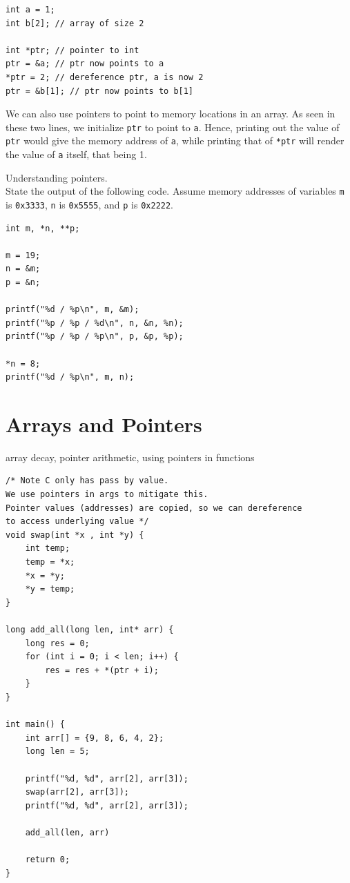 \begin{verbatim}
int a = 1;
int b[2]; // array of size 2

int *ptr; // pointer to int
ptr = &a; // ptr now points to a
*ptr = 2; // dereference ptr, a is now 2
ptr = &b[1]; // ptr now points to b[1]
\end{verbatim}

We can also use pointers to point to memory locations in an array.
As seen in these two lines, we initialize \verb|ptr| to point to \verb|a|.
Hence, printing out the value of \verb|ptr| would give the memory address of \verb|a|, while printing that of \verb|*ptr| will render the value of \verb|a| itself, that being 1.


\begin{exercise} \label{pointers1} 
Understanding pointers. \\
State the output of the following code.
Assume memory addresses of variables \verb|m| is \verb|0x3333|,  \verb|n| is \verb|0x5555|, and \verb|p| is \verb|0x2222|.
\begin{verbatim}
int m, *n, **p;

m = 19;
n = &m;
p = &n;

printf("%d / %p\n", m, &m);
printf("%p / %p / %d\n", n, &n, %n);
printf("%p / %p / %p\n", p, &p, %p);

*n = 8;
printf("%d / %p\n", m, n);
\end{verbatim}
\end{exercise}

\section{Arrays and Pointers}
array decay, pointer arithmetic, using pointers in functions

\begin{verbatim}
/* Note C only has pass by value. 
We use pointers in args to mitigate this. 
Pointer values (addresses) are copied, so we can dereference 
to access underlying value */
void swap(int *x , int *y) {
    int temp;
    temp = *x;
    *x = *y;
    *y = temp;
}

long add_all(long len, int* arr) {
    long res = 0;
    for (int i = 0; i < len; i++) {
        res = res + *(ptr + i);
    }
}

int main() {
    int arr[] = {9, 8, 6, 4, 2};
    long len = 5;

    printf("%d, %d", arr[2], arr[3]);
    swap(arr[2], arr[3]);
    printf("%d, %d", arr[2], arr[3]);

    add_all(len, arr)

    return 0;
}
\end{verbatim}

